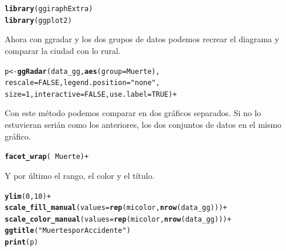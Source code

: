 \documentclass{article}\usepackage[]{graphicx}\usepackage[]{color}
\makeatletter
\newcommand{\hlnum}[1]{\textcolor[rgb]{0.686,0.059,0.569}{#1}}%
\newcommand{\hlstr}[1]{\textcolor[rgb]{0.192,0.494,0.8}{#1}}%
\newcommand{\hlopt}[1]{\textcolor[rgb]{0,0,0}{#1}}%
\newcommand{\hlstd}[1]{\textcolor[rgb]{0.345,0.345,0.345}{#1}}%
\newcommand{\hlkwc}[1]{\textcolor[rgb]{0.333,0.667,0.333}{#1}}%
\newcommand{\hlkwd}[1]{\textcolor[rgb]{0.737,0.353,0.396}{\textbf{#1}}}%
\newenvironment{kframe}{%
 \def\at@end@of@kframe{}%
 \ifinner\ifhmode%
  \def\at@end@of@kframe{\end{minipage}}%
  \begin{minipage}{\columnwidth}%
 \fi\fi%
 \def\FrameCommand##1{\hskip\@totalleftmargin \hskip-\fboxsep
 \colorbox{shadecolor}{##1}\hskip-\fboxsep
     \hskip-\linewidth \hskip-\@totalleftmargin \hskip\columnwidth}%
 \MakeFramed {\advance\hsize-\width
   \@totalleftmargin\z@ \linewidth\hsize
   \@setminipage}}%
 {\par\unskip\endMakeFramed%
 \at@end@of@kframe}
\newenvironment{knitrout}{}{} %
\makeatother
\begin{document}
\begin{knitrout}
\color{fgcolor}\begin{kframe}
\begin{alltt}
\hlkwd{library}\hlstd{(ggiraphExtra)}
\hlkwd{library}\hlstd{(ggplot2)}
\end{alltt}
\end{kframe}
\end{knitrout}
Ahora con ggradar y los dos grupos de datos podemos recrear el diagrama y comparar la ciudad con lo rural.
\begin{knitrout}
\color{fgcolor}\begin{kframe}
\begin{alltt}
p <- \hlkwd{ggRadar}(data_gg, \hlkwd{aes}(group = Muerte), 
             rescale = FALSE, legend.position = \hlstr{"none"},
             size = 1, interactive = FALSE, use.label = TRUE) +
\end{alltt}
\end{kframe}
\end{knitrout}
Con este m\'etodo podemos comparar en dos gr\'aficos separados. Si no lo estuvieran seri\'an como los anteriores, los dos conjuntos de datos en el mismo gr\'afico.
\begin{knitrout}
\color{fgcolor}\begin{kframe}
\begin{alltt}
  \hlkwd{facet_wrap}(~Muerte) +
\end{alltt}
\end{kframe}
\end{knitrout}
Y por \'ultimo el rango, el color y el t\'itulo.
\begin{knitrout}
\color{fgcolor}\begin{kframe}
\begin{alltt}
  \hlkwd{ylim}\hlstd{(}\hlnum{0}\hlstd{,}\hlnum{10}\hlstd{)} \hlopt{+}
  \hlkwd{scale_fill_manual}\hlstd{(}\hlkwc{values} \hlstd{=} \hlkwd{rep}\hlstd{(micolor,} \hlkwd{nrow}\hlstd{(data_gg)))} \hlopt{+}
  \hlkwd{scale_color_manual}\hlstd{(}\hlkwc{values} \hlstd{=} \hlkwd{rep}\hlstd{(micolor,} \hlkwd{nrow}\hlstd{(data_gg)))} \hlopt{+}
  \hlkwd{ggtitle}\hlstd{(}\hlstr{"Muertes por Accidente"}\hlstd{)}
\hlkwd{print}\hlstd{(p)}
\end{alltt}
\end{kframe}
\end{knitrout}
\end{document}
